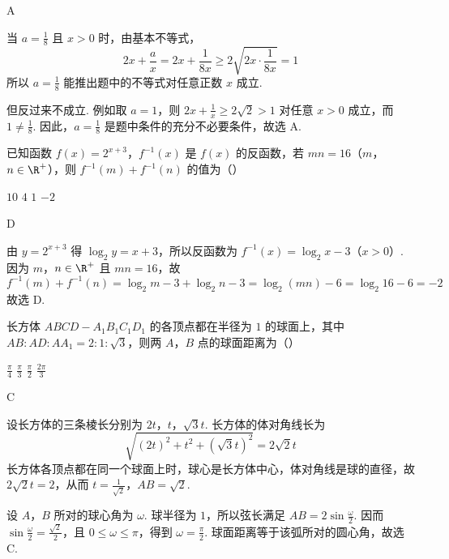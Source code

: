 \begin{answer}
A
\end{answer}

\begin{solution}
当 \(a=\frac{1}{8}\) 且 \(x>0\) 时，由基本不等式，
\[
2x+\frac{a}{x}=2x+\frac{1}{8x}\geqslant2\sqrt{2x\cdot\frac{1}{8x}}=1
\]
所以 \(a=\frac{1}{8}\) 能推出题中的不等式对任意正数 \(x\) 成立.

但反过来不成立. 例如取 \(a=1\)，则
\(2x+\frac{1}{x}\geqslant2\sqrt{2}>1\) 对任意 \(x>0\) 成立，而 \(1\ne\frac{1}{8}\).
因此，\(a=\frac{1}{8}\) 是题中条件的充分不必要条件，故选 A.
\end{solution}

\begin{problem}
已知函数 \( f(x) = 2^{x + 3} \)，\( f^{-1}(x) \) 是 \( f(x) \) 的反函数，若 \(mn = 16\)（\(m\)，\(n \in \R^{+}\)），则 \( f^{-1}(m) + f^{-1}(n) \) 的值为（\quad）

\choices
    {\(10\)}
    {\(4\)}
    {\(1\)}
    {\(-2\)}
\end{problem}

\begin{answer}
D
\end{answer}

\begin{solution}
由 \(y=2^{x+3}\) 得 \(\log_2 y=x+3\)，所以反函数为
\(f^{-1}(x)=\log_2 x-3\)（\(x>0\)）.
因为 \(m\)，\(n\in\R^+\) 且 \(mn=16\)，故
\[
f^{-1}(m)+f^{-1}(n)=\log_2m-3+\log_2n-3
=\log_2(mn)-6=\log_2 16-6=-2
\]
故选 D.
\end{solution}

\begin{problem}
长方体 \(ABCD - A_{1}B_{1}C_{1}D_{1}\) 的各顶点都在半径为 \(1\) 的球面上，其中 \(AB:AD:AA_{1}=2:1:\sqrt{3}\)，则两 \(A\)，\(B\) 点的球面距离为（\quad）

\choices
    {\(\frac{\pi}{4}\)}
    {\(\frac{\pi}{3}\)}
    {\(\frac{\pi}{2}\)}
    {\(\frac{2\pi}{3}\)}
\end{problem}

\begin{answer}
C
\end{answer}

\begin{solution}
设长方体的三条棱长分别为 \(2t\)，\(t\)，\(\sqrt{3}t\). 长方体的体对角线长为
\[
\sqrt{(2t)^2+t^2+(\sqrt{3}t)^2}=2\sqrt{2}t
\]
长方体各顶点都在同一个球面上时，球心是长方体中心，体对角线是球的直径，故
\(2\sqrt{2}t=2\)，从而 \(t=\frac{1}{\sqrt{2}}\)，\(AB=\sqrt{2}\).

设 \(A\)，\(B\) 所对的球心角为 \(\omega\). 球半径为 \(1\)，所以弦长满足
\(AB=2\sin\frac{\omega}{2}\). 因而
\(\sin\frac{\omega}{2}=\frac{\sqrt{2}}{2}\)，且 \(0\leqslant\omega\leqslant\pi\)，得到 \(\omega=\frac{\pi}{2}\).
球面距离等于该弧所对的圆心角，故选 C.
\end{solution}

